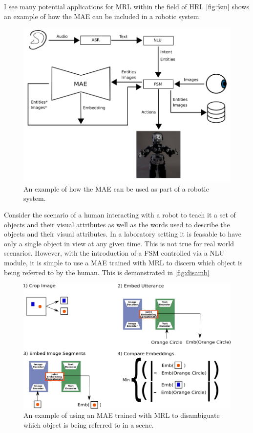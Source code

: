 I see many potential applications for \ac{MRL} within the field of \ac{HRI}. \autoref{fig:fsm} shows an example of how the \ac{MAE} can be included in a robotic system.


\begin{figure}
\centering
\includegraphics[width=\textwidth]{Figs/futureWork/fsm.png}
\caption{An example of how the \ac{MAE} can be used as part of a robotic system.}
\label{fig:fsm}
\end{figure}

Consider the scenario of a human interacting with a robot to teach it a set of objects and their visual attributes as well as the words used to describe the objects and their visual attributes. In a laboratory setting it is feasable to have only a single object in view at any given time. This is not true for real world scenarios. However, with the introduction of a \ac{FSM} controlled via a \ac{NLU} module, it is simple to use a \ac{MAE} trained with \ac{MRL} to discern which object is being referred to by the human. This is demonstrated in \autoref{fig:disamb}

\begin{figure}
\centering
\includegraphics[width=\textwidth]{Figs/shapes/findingRefferant.png}
\caption{An example of using an MAE trained with MRL to disambiguate which object is being referred to in a scene.}
\label{fig:disamb}
\end{figure}

